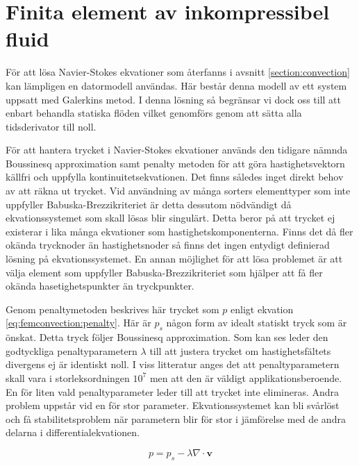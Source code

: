 \section{Finita element av inkompressibel fluid}
\label{sec:femconvection}
För att lösa Navier-Stokes ekvationer som återfanns i avsnitt
\ref{section:convection} kan lämpligen en datormodell användas.
Här består denna modell av ett system uppsatt med Galerkins metod.
I denna lösning så begränsar vi dock oss till att enbart behandla statiska flöden
vilket genomförs genom att sätta alla tidsderivator till noll.

För att hantera trycket i Navier-Stokes ekvationer
används den tidigare nämnda Boussinesq approximation
samt penalty metoden för att göra hastighetsvektorn källfri och uppfylla
kontinuitetsekvationen. Det finns således inget direkt behov av att räkna ut trycket.
Vid användning av många sorters elementtyper som inte uppfyller Babuska-Brezzikriteriet
är detta dessutom nödvändigt då ekvationssystemet som skall lösas blir singulärt. 
Detta beror på att trycket ej existerar i lika många ekvationer som hastighetskomponenterna.
Finns det då fler okända trycknoder än hastighetsnoder så finns det ingen entydigt definierad lösning
på ekvationssystemet. En annan möjlighet för att lösa problemet är att välja element som
uppfyller Babuska-Brezzikriteriet som hjälper att få fler okända hasetighetspunkter än tryckpunkter.
\cite{babuska1973}\cite{segal2011}

Genom penaltymetoden beskrives här trycket som $p$ enligt ekvation
\eqref{eq:femconvection:penalty}. Här är $p_s$ någon form av idealt statiskt
tryck som är önskat. Detta tryck följer Boussinesq approximation.
\cite{heinrich88}\cite{taylor79}
Som kan ses leder den godtyckliga penaltyparametern $\lambda$ till att justera trycket
om hastighetsfältets divergens ej är identiskt noll. I viss litteratur anges 
det att penaltyparametern skall vara i storleksordningen $10^7$ men att den
är väldigt applikationsberoende. En för liten vald penaltyparameter leder till att
trycket inte elimineras. Andra problem uppstår vid en för stor parameter. Ekvationssystemet
kan bli svårlöst och få stabilitetsproblem när parametern blir
för stor i jämförelse med de andra delarna i differentialekvationen.\cite{reddy93}\cite{roy05}\cite{basak04}\cite{segal2011}

\begin{equation}
\label{eq:femconvection:penalty}
p = p_s - \lambda\nabla\cdot\mathbf{v}
\end{equation}

